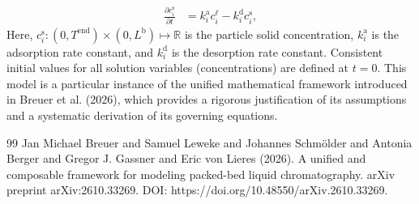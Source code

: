 \documentclass{article}
\begin{document}
\begin{align}
    \frac{\partial c^{\mathrm{s}}_{i}}{\partial t}
    &= k^{\mathrm{a}}_{i} c^{\mathrm{\ell}}_{i}
        - k^{\mathrm{d}}_{i} c^{\mathrm{s}}_{i},
\end{align}
Here, $c^{\mathrm{s}}_{i}\colon (0, T^{\mathrm{end}}) \times (0, L^{\mathrm{b}}) \mapsto \mathbb{R}$ is the particle solid concentration, $k^{\mathrm{a}}_{i}$ is the adsorption rate constant, and $k^{\mathrm{d}}_{i}$ is the desorption rate constant.
Consistent initial values for all solution variables (concentrations) are defined at $t = 0$.
This model is a particular instance of the unified mathematical framework introduced in Breuer et al. (2026), which provides a rigorous justification of its assumptions and a systematic derivation of its governing equations.
\begin{thebibliography}{99}
     Jan Michael Breuer and Samuel Leweke and Johannes Schmölder and Antonia Berger and Gregor J. Gassner and Eric von Lieres (2026). A unified and composable framework for modeling packed-bed liquid chromatography. arXiv preprint arXiv:2610.33269. DOI: https://doi.org/10.48550/arXiv.2610.33269.
\end{thebibliography}
\end{document}
